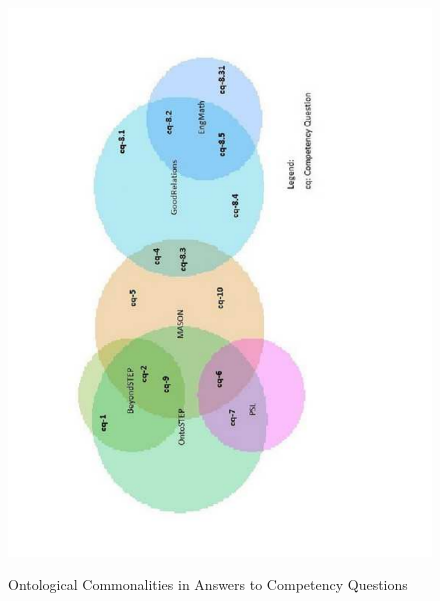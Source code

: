 \begin{figure}
	\begin{center}
		\includegraphics[scale=0.8]{figure-chapterIV/fig4-8}\\
		\caption{Ontological Commonalities in Answers to Competency Questions}
		\label{figure4-8}
	\end{center}
\end{figure}



